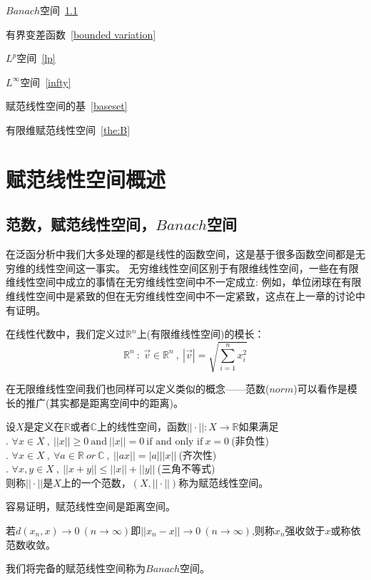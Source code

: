 \begin{introduction}
    \item $Banach$空间~\ref{Banach}
    \item 有界变差函数~\ref{bounded variation}
    \item $L^p$空间~\ref{lp}
    \item $L^{\infty}$空间~\ref{infty}
    \item 赋范线性空间的基~\ref{baseset}
    \item 有限维赋范线性空间~\ref{the:B}
  \end{introduction}
\section{赋范线性空间概述}
\subsection{范数，赋范线性空间，$Banach$空间} \label{Banach}
在泛函分析中我们大多处理的都是线性的函数空间，这是基于很多函数空间都是无穷维的线性空间这一事实。
无穷维线性空间区别于有限维线性空间，一些在有限维线性空间中成立的事情在无穷维线性空间中不一定成立:
例如，单位闭球在有限维线性空间中是紧致的但在无穷维线性空间中不一定紧致，这点在上一章的讨论中有证明。

在线性代数中，我们定义过$\mathbb{R}^n$上(有限维线性空间)的模长：
\[\mathbb{R}^n \ : \ \vec{v} \in \mathbb{R}^n \ , \ |\vec{v}|=\sqrt{\sum_{i=1}^nx_i^2}\]

在无限维线性空间我们也同样可以定义类似的概念——范数($norm$)可以看作是模长的推广(其实都是距离空间中的距离)。
\begin{definition}[范数]
    设$X$是定义在$\mathbb{R}$或者$\mathbb{C}$上的线性空间，函数$|| \cdot ||:X \to \mathbb{R}$如果满足\\
    . $\forall x \in X \ , \ ||x|| \geq 0 \ \text{and} \ ||x||=0 \ \text{if and only if} \ x=0 \ $(非负性)\\
    . $\forall x \in X \ , \ \forall a \in \mathbb{R} \ or \ \mathbb{C} \ , \ ||ax||=|a|||x|| \ $(齐次性)\\
    . $\forall x,y \in X \ , \ ||x+y|| \leq ||x||+||y|| \ $(三角不等式)\\
    则称$||\cdot||$是$X$上的一个范数，$(X,||\cdot||)$称为赋范线性空间。
\end{definition}
容易证明，赋范线性空间是距离空间。
\begin{definition}
    若$d(x_n,x) \to 0 \ (n \to \infty)$即$||x_n-x|| \to 0 \ (n \to \infty)$,则称$x_n$强收敛于$x$或称依范数收敛。
\end{definition}
我们将完备的赋范线性空间称为$Banach$空间。

